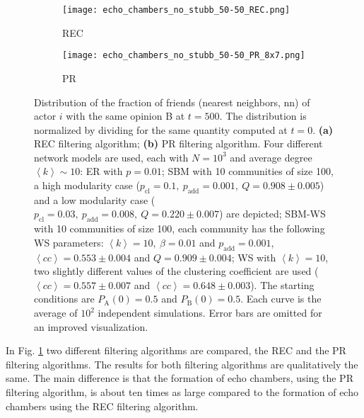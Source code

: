 \documentclass[11 pt , letterpaper , twoside , openright]{book}
\begin{document}
\begin{figure}[H]
  \begin{subfigure}[b]{0.49\textwidth}
    \caption{REC}
  	\texttt{[image: echo\_chambers\_no\_stubb\_50-50\_REC.png]}
      \end{subfigure}
  \begin{subfigure}[b]{0.49\textwidth}
    \caption{PR}
  	\texttt{[image: echo\_chambers\_no\_stubb\_50-50\_PR\_8x7.png]}
  \end{subfigure}
  \captionsetup{format=plain}
  \caption[Distribution of the fraction of friends (nearest neighbors, nn) of actor $i$ with the same opinion B at $t=500$, $\left<P_{\text{B}}^{\text{nn}}\right>$, for an initial $50/50$ opinion distribution.]{Distribution of the fraction of friends (nearest neighbors, nn) of actor $i$ with the same opinion B at $t = 500$. The distribution is normalized by dividing for the same quantity computed at $t=0$. \textbf{(a)} REC filtering algorithm; \textbf{(b)} PR filtering algorithm. Four different network models are used, each with $N = 10^3$ and average degree $\left<k\right> \sim 10$: ER with $p = 0.01$; SBM with 10 communities of size 100, a high modularity case ($p_{\text{cl}} = 0.1,\ p_{\text{add}} = 0.001,\ Q = 0.908 \pm 0.005$) and a low modularity case ($p_{\text{cl}} = 0.03,\ p_{\text{add}} = 0.008,\ Q = 0.220 \pm 0.007$) are depicted; SBM-WS with 10 communities of size 100, each community has the following WS parameters: $\left<k\right> = 10,\ \beta = 0.01$ and $p_{\text{add}} = 0.001$, $\left<cc\right> = 0.553 \pm 0.004$ and $Q = 0.909 \pm 0.004$; WS with $\left<k\right> = 10$, two slightly different values of the clustering coefficient are used ($\left<cc\right> = 0.557 \pm 0.007$ and $\left<cc\right> = 0.648 \pm 0.003$). The starting conditions are $P_{\text{A}}(0) = 0.5$ and $P_{\text{B}}(0) = 0.5$. Each curve is the average of $10^2$ independent simulations. Error bars are omitted for an improved visualization.}
\label{echo_50_50}
\end{figure}
\noindent
In Fig. \ref{echo_50_50} two different filtering algorithms are compared, the REC and the PR filtering algorithms. The results for both filtering algorithms are qualitatively the same. The main difference is that the formation of echo chambers, using the PR filtering algorithm, is about ten times as large compared to the formation of echo chambers using the REC filtering algorithm. \\
\newline
\end{document}
